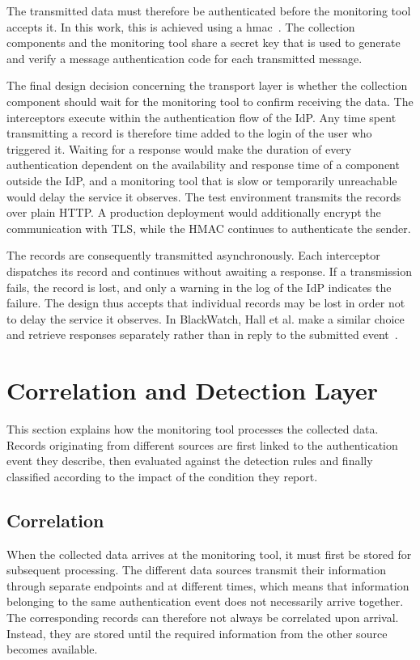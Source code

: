 \documentclass[../main.tex]{subfiles}
\begin{document}
The transmitted data must therefore be authenticated before the monitoring tool accepts it. 
In this work, this is achieved using a \gls{hmac}~\cite{HMAC}. 
The collection components and the monitoring tool share a secret key that is used to generate and verify a 
message authentication code for each transmitted message.

The final design decision concerning the transport layer is whether the collection component should wait for 
the monitoring tool to confirm receiving the data. 
The interceptors execute within the authentication flow of the IdP. 
Any time spent transmitting a record is therefore time added to the login of the user who triggered it. 
Waiting for a response would make the duration of every authentication dependent on the availability and 
response time of a component outside the IdP, and a monitoring tool that is slow or temporarily unreachable 
would delay the service it observes. 
The test environment transmits the records over plain HTTP. 
A production deployment would additionally encrypt the communication with TLS, while the HMAC 
continues to authenticate the sender. 

The records are consequently transmitted asynchronously. 
Each interceptor dispatches its record and continues without awaiting a response. 
If a transmission fails, the record is lost, and only a warning in the log of the IdP indicates 
the failure. 
The design thus accepts that individual records may be lost in order not to delay the service it 
observes. 
In BlackWatch, Hall et al. make a similar choice and retrieve responses separately rather than in 
reply to the submitted event~\cite{BlackWatch}. 

\section{Correlation and Detection Layer}\label{sec:processing}

This section explains how the monitoring tool processes the collected data. 
Records originating from different sources are first linked to the authentication event they describe, then 
evaluated against the detection rules and finally classified according to the impact of the condition they report.

\subsection{Correlation}\label{subsec:correlation}

When the collected data arrives at the monitoring tool, it must first be stored for subsequent 
processing. 
The different data sources transmit their information through separate endpoints and at 
different times, which means that information belonging to the same authentication event does 
not necessarily arrive together. 
The corresponding records can therefore not always be correlated upon arrival. 
Instead, they are stored until the required information from the other source becomes available.
\end{document}
